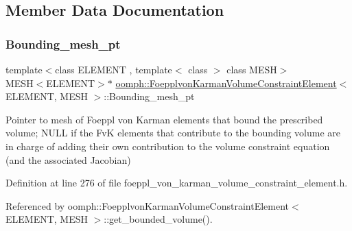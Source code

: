 \subsection{Member Data Documentation}
\mbox{\label{classoomph_1_1FoepplvonKarmanVolumeConstraintElement_a0bebd0ba7ecef23139c97ed56ee83b71}} 
\subsubsection{\texorpdfstring{Bounding\+\_\+mesh\+\_\+pt}{Bounding\_mesh\_pt}}
{\footnotesize\ttfamily template$<$class E\+L\+E\+M\+E\+NT , template$<$ class $>$ class M\+E\+SH$>$ \\
M\+E\+SH$<$E\+L\+E\+M\+E\+NT$>$$\ast$ \hyperlink{classoomph_1_1FoepplvonKarmanVolumeConstraintElement}{oomph\+::\+Foepplvon\+Karman\+Volume\+Constraint\+Element}$<$ E\+L\+E\+M\+E\+NT, M\+E\+SH $>$\+::Bounding\+\_\+mesh\+\_\+pt\hspace{0.3cm}{\ttfamily [protected]}}



Pointer to mesh of Foeppl von Karman elements that bound the prescribed volume; N\+U\+LL if the FvK elements that contribute to the bounding volume are in charge of adding their own contribution to the volume constraint equation (and the associated Jacobian) 



Definition at line 276 of file foeppl\+\_\+von\+\_\+karman\+\_\+volume\+\_\+constraint\+\_\+element.\+h.



Referenced by oomph\+::\+Foepplvon\+Karman\+Volume\+Constraint\+Element$<$ E\+L\+E\+M\+E\+N\+T, M\+E\+S\+H $>$\+::get\+\_\+bounded\+\_\+volume().

\mbox{\label{classoomph_1_1FoepplvonKarmanVolumeConstraintElement_ab7504a6d7b951b3a8c0580acddd4d3b0}} 
